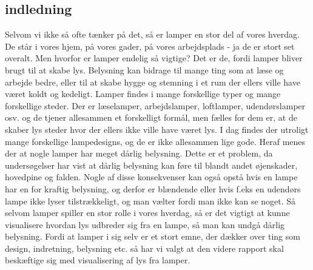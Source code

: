 \subsection{indledning}

Selvom vi ikke så ofte tænker på det, så er lamper en stor del af vores hverdag. De står i vores hjem, på vores gader, på vores arbejdsplads - ja de er stort set overalt. Men hvorfor er lamper endelig så vigtige? Det er de, fordi lamper bliver brugt til at skabe lys. Belysning kan bidrage til mange ting som at læse og arbejde bedre, eller til at skabe hygge og stemning i et rum der ellers ville have været koldt og kedeligt. Lamper findes i mange forskellige typer og mange forskellige steder. Der er læselamper, arbejdslamper, loftlamper, udendørslamper osv. og de tjener allesammen et forskelligt formål, men fælles for dem er, at de skaber lys steder hvor der ellers ikke ville have været lys. 
I dag findes der utroligt mange forskellige lampedesigns, og de er ikke allesammen lige gode. Heraf menes der at nogle lamper har meget dårlig belysning. Dette er et problem, da undersøgelser har vist at dårlig belysning kan føre til blandt andet øjenskader, hovedpine og falden. Nogle af disse konsekvenser kan også opstå hvis en lampe har en for kraftig belysning, og derfor er blændende eller hvis f.eks en udendørs lampe ikke lyser tilstrækkeligt, og man vælter fordi man ikke kan se noget. 
Så selvom lamper spiller en stor rolle i vores hverdag, så er det vigtigt at kunne visualisere hvordan lys udbreder sig fra en lampe, så man kan undgå dårlig belysning. 
Fordi at lamper i sig selv er et stort emne, der dækker over ting som design, indretning, belysning etc. så har vi valgt at den videre rapport skal beskæftige sig med visualisering af lys fra lamper. 


